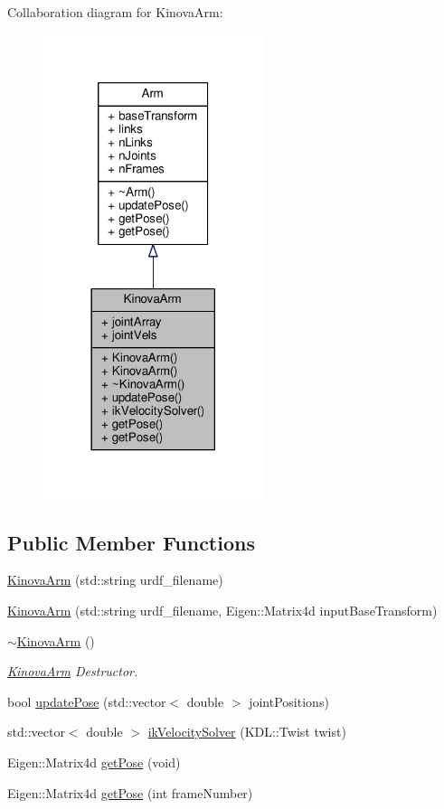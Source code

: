 Collaboration diagram for Kinova\+Arm\+:\nopagebreak
\begin{figure}[H]
\begin{center}
\leavevmode
\includegraphics[width=182pt]{class_kinova_arm__coll__graph}
\end{center}
\end{figure}
\subsection*{Public Member Functions}
\begin{DoxyCompactItemize}
\item 
\hyperlink{class_kinova_arm_abbbe90c0d43bf6665d62bdf6c1ef398f}{Kinova\+Arm} (std\+::string urdf\+\_\+filename)
\item 
\hyperlink{class_kinova_arm_a5ca50dcf1c211aea4986bc5a04f37331}{Kinova\+Arm} (std\+::string urdf\+\_\+filename, Eigen\+::\+Matrix4d input\+Base\+Transform)
\item 
\hyperlink{class_kinova_arm_a9d5b485d8137a0b27e98a0c1c4d67861}{$\sim$\+Kinova\+Arm} ()
\begin{DoxyCompactList}\small\item\em \hyperlink{class_kinova_arm}{Kinova\+Arm} Destructor. \end{DoxyCompactList}\item 
bool \hyperlink{class_kinova_arm_a3374988c7b3d9ae8773bc63f950629f7}{update\+Pose} (std\+::vector$<$ double $>$ joint\+Positions)
\item 
std\+::vector$<$ double $>$ \hyperlink{class_kinova_arm_a0a5a3bd128b420d58d92d242c075db92}{ik\+Velocity\+Solver} (K\+D\+L\+::\+Twist twist)
\item 
Eigen\+::\+Matrix4d \hyperlink{class_kinova_arm_aea7c01f72eb70387ff71ca130db3bd3f}{get\+Pose} (void)
\item 
Eigen\+::\+Matrix4d \hyperlink{class_kinova_arm_ae6b5c17c1b7b79bc3de00e8d38b80999}{get\+Pose} (int frame\+Number)
\end{DoxyCompactItemize}
